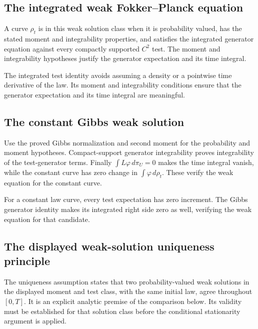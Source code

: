 \documentclass[11pt,a4paper]{article}
\begin{document}
\subsection{\texorpdfstring{The integrated weak Fokker–Planck equation}{The integrated weak Fokker–Planck equation}}


A curve \(\rho_t\) is in this weak solution class when it is probability valued, has the stated moment and integrability properties, and satisfies the integrated generator equation against every compactly supported \(C^2\) test. The moment and integrability hypotheses justify the generator expectation and its time integral.



The integrated test identity avoids assuming a density or a pointwise time derivative of the law. Its moment and integrability conditions ensure that the generator expectation and its time integral are meaningful.


\subsection{\texorpdfstring{The constant Gibbs weak solution}{The constant Gibbs weak solution}}


Use the proved Gibbs normalization and second moment for the probability and moment hypotheses. Compact-support generator integrability proves integrability of the test-generator terms. Finally \(\int L\varphi\,d\pi_U=0\) makes the time integral vanish, while the constant curve has zero change in \(\int\varphi\,d\rho_t\). These verify the weak equation for the constant curve.



For a constant law curve, every test expectation has zero increment. The Gibbs generator identity makes its integrated right side zero as well, verifying the weak equation for that candidate.


\subsection{\texorpdfstring{The displayed weak-solution uniqueness principle}{The displayed weak-solution uniqueness principle}}


The uniqueness assumption states that two probability-valued weak solutions in the displayed moment and test class, with the same initial law, agree throughout \([0,T]\). It is an explicit analytic premise of the comparison below. Its validity must be established for that solution class before the conditional stationarity argument is applied.
\end{document}
